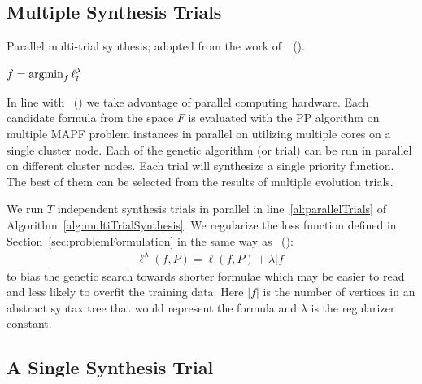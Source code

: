 \documentclass[letterpaper]{article}
\newcommand{\bea}{\begin{eqnarray}}
\newcommand{\eea}{\end{eqnarray}}
\newcommand{\argmin}{\operatornamewithlimits{argmin}\limits}
\newcommand{\citea}[1]{\citeauthor{#1}~(\citeyear{#1})}
\begin{document}
\subsection{Multiple Synthesis Trials}
\label{mult_syn_trials}

\begin{algorithm}[t!]
\DontPrintSemicolon
\caption{Parallel multi-trial synthesis; adopted from the work of~\citea{bulitko2022portability}.}
\label{alg:multiTrialSynthesis}
{\footnotesize
{}


\Return $ f = \argmin\nolimits_f \ell^\lambda_t $ \; \label{al:bestTrial}
}
\end{algorithm}

In line with \citea{bulitko2022portability} we take advantage of parallel computing hardware. Each candidate formula from the space $ F $ is evaluated with the PP algorithm on multiple MAPF problem instances in parallel on utilizing multiple cores on a single cluster node.  Each of the genetic algorithm (or trial) can be run in parallel on different cluster nodes. Each trial will synthesize a single priority function. The best of them can be selected from the results of multiple evolution trials.

We run $ T $ independent synthesis trials in parallel in line~\ref{al:parallelTrials} of Algorithm~\ref{alg:multiTrialSynthesis}. We regularize the loss function defined in Section~\ref{sec:problemFormulation} in the same way as \citea{bulitko2022portability}: \bea \ell^{\lambda}(f, P) = \ell(f, P) + \lambda |f|\eea to bias the genetic search towards shorter formulae which may be easier to read and less likely to overfit the training data. Here $ |f| $ is the number of vertices in an abstract syntax tree that would represent the formula and $ \lambda $ is the regularizer constant.


\subsection{A Single Synthesis Trial}
\label{sec:singleTrial}
\end{document}
